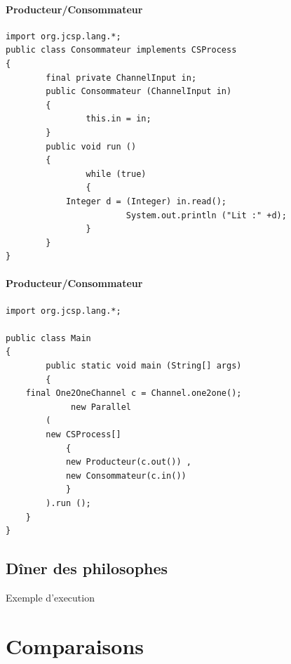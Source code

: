 \documentclass[slidetop,11pt]{beamer}
\begin{document}
\begin{frame}[containsverbatim]
\framesubtitle{Producteur/Consommateur}
\begin{lstlisting}[frame=trBL,title={Producteurs-Consommateurs: Consommateur.java}]
import org.jcsp.lang.*;
public class Consommateur implements CSProcess
{
        final private ChannelInput in;
        public Consommateur (ChannelInput in)
        {
                this.in = in;
        }
        public void run ()
        {
                while (true)
                {
			Integer d = (Integer) in.read();
                        System.out.println ("Lit :" +d);
                }
        }
}
\end{lstlisting}
\end{frame}

\begin{frame}[containsverbatim]
\framesubtitle{Producteur/Consommateur}
\begin{lstlisting}[frame=trBL,title={Producteurs-Consommateurs: Main.java}]
import org.jcsp.lang.*;

public class Main
{
        public static void main (String[] args)
        {
	final One2OneChannel c = Channel.one2one();
             new Parallel
		(
		new CSProcess[]
			{
			new Producteur(c.out()) ,
			new Consommateur(c.in())
			} 
		).run ();
	}
}
\end{lstlisting}
\end{frame}

\subsection{D\^iner des philosophes}
\begin{frame}
Exemple d'execution
\end{frame}

\section{Comparaisons}
\end{document}
